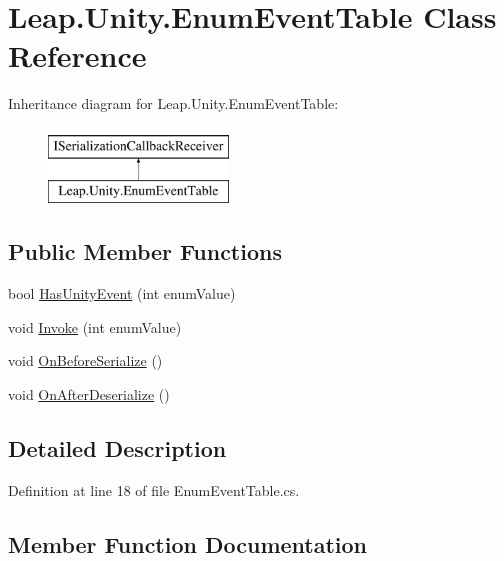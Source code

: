 \hypertarget{class_leap_1_1_unity_1_1_enum_event_table}{}\section{Leap.\+Unity.\+Enum\+Event\+Table Class Reference}
\label{class_leap_1_1_unity_1_1_enum_event_table}
Inheritance diagram for Leap.\+Unity.\+Enum\+Event\+Table\+:\begin{figure}[H]
\begin{center}
\leavevmode
\includegraphics[height=2.000000cm]{class_leap_1_1_unity_1_1_enum_event_table}
\end{center}
\end{figure}
\subsection*{Public Member Functions}
\begin{DoxyCompactItemize}
\item 
bool \mbox{\hyperlink{class_leap_1_1_unity_1_1_enum_event_table_a48353e24a209e028ef8d34afe7e00eb7}{Has\+Unity\+Event}} (int enum\+Value)
\item 
void \mbox{\hyperlink{class_leap_1_1_unity_1_1_enum_event_table_adbfb8b83e3f9f437151ecbced7afe35c}{Invoke}} (int enum\+Value)
\item 
void \mbox{\hyperlink{class_leap_1_1_unity_1_1_enum_event_table_aa2f8d03ec5a8d998a4a24f27eee34740}{On\+Before\+Serialize}} ()
\item 
void \mbox{\hyperlink{class_leap_1_1_unity_1_1_enum_event_table_abb4ddfe2dedb2563e2d1f775de1beb05}{On\+After\+Deserialize}} ()
\end{DoxyCompactItemize}


\subsection{Detailed Description}


Definition at line 18 of file Enum\+Event\+Table.\+cs.



\subsection{Member Function Documentation}
\mbox{\label{class_leap_1_1_unity_1_1_enum_event_table_a48353e24a209e028ef8d34afe7e00eb7}} 
